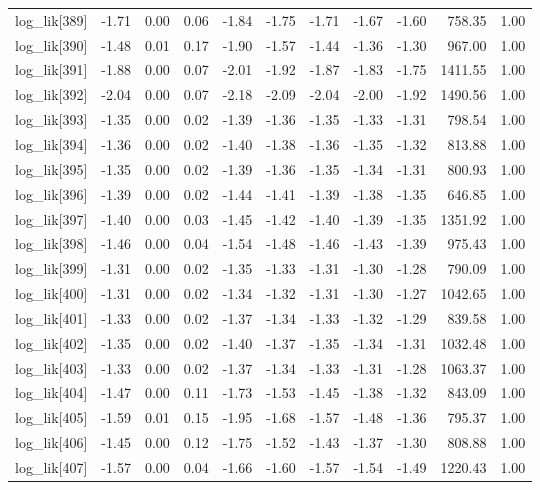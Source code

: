 \begin{table}[ht]
\begin{tabular}{rrrrrrrrrrr}
  log\_lik[389] & -1.71 & 0.00 & 0.06 & -1.84 & -1.75 & -1.71 & -1.67 & -1.60 & 758.35 & 1.00 \\ 
  log\_lik[390] & -1.48 & 0.01 & 0.17 & -1.90 & -1.57 & -1.44 & -1.36 & -1.30 & 967.00 & 1.00 \\ 
  log\_lik[391] & -1.88 & 0.00 & 0.07 & -2.01 & -1.92 & -1.87 & -1.83 & -1.75 & 1411.55 & 1.00 \\ 
  log\_lik[392] & -2.04 & 0.00 & 0.07 & -2.18 & -2.09 & -2.04 & -2.00 & -1.92 & 1490.56 & 1.00 \\ 
  log\_lik[393] & -1.35 & 0.00 & 0.02 & -1.39 & -1.36 & -1.35 & -1.33 & -1.31 & 798.54 & 1.00 \\ 
  log\_lik[394] & -1.36 & 0.00 & 0.02 & -1.40 & -1.38 & -1.36 & -1.35 & -1.32 & 813.88 & 1.00 \\ 
  log\_lik[395] & -1.35 & 0.00 & 0.02 & -1.39 & -1.36 & -1.35 & -1.34 & -1.31 & 800.93 & 1.00 \\ 
  log\_lik[396] & -1.39 & 0.00 & 0.02 & -1.44 & -1.41 & -1.39 & -1.38 & -1.35 & 646.85 & 1.00 \\ 
  log\_lik[397] & -1.40 & 0.00 & 0.03 & -1.45 & -1.42 & -1.40 & -1.39 & -1.35 & 1351.92 & 1.00 \\ 
  log\_lik[398] & -1.46 & 0.00 & 0.04 & -1.54 & -1.48 & -1.46 & -1.43 & -1.39 & 975.43 & 1.00 \\ 
  log\_lik[399] & -1.31 & 0.00 & 0.02 & -1.35 & -1.33 & -1.31 & -1.30 & -1.28 & 790.09 & 1.00 \\ 
  log\_lik[400] & -1.31 & 0.00 & 0.02 & -1.34 & -1.32 & -1.31 & -1.30 & -1.27 & 1042.65 & 1.00 \\ 
  log\_lik[401] & -1.33 & 0.00 & 0.02 & -1.37 & -1.34 & -1.33 & -1.32 & -1.29 & 839.58 & 1.00 \\ 
  log\_lik[402] & -1.35 & 0.00 & 0.02 & -1.40 & -1.37 & -1.35 & -1.34 & -1.31 & 1032.48 & 1.00 \\ 
  log\_lik[403] & -1.33 & 0.00 & 0.02 & -1.37 & -1.34 & -1.33 & -1.31 & -1.28 & 1063.37 & 1.00 \\ 
  log\_lik[404] & -1.47 & 0.00 & 0.11 & -1.73 & -1.53 & -1.45 & -1.38 & -1.32 & 843.09 & 1.00 \\ 
  log\_lik[405] & -1.59 & 0.01 & 0.15 & -1.95 & -1.68 & -1.57 & -1.48 & -1.36 & 795.37 & 1.00 \\ 
  log\_lik[406] & -1.45 & 0.00 & 0.12 & -1.75 & -1.52 & -1.43 & -1.37 & -1.30 & 808.88 & 1.00 \\ 
  log\_lik[407] & -1.57 & 0.00 & 0.04 & -1.66 & -1.60 & -1.57 & -1.54 & -1.49 & 1220.43 & 1.00 \\ 

\end{tabular}
\end{table}

